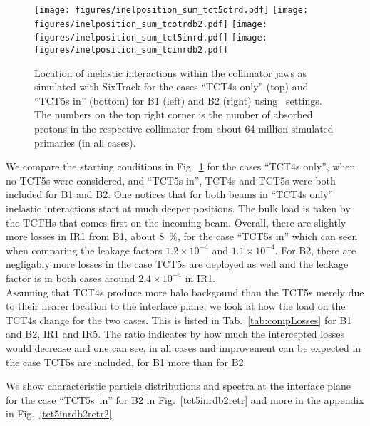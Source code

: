 \begin{figure}%
\begin{center}
\texttt{[image: figures/inelposition\_sum\_tct5otrd.pdf]}
\texttt{[image: figures/inelposition\_sum\_tcotrdb2.pdf]}
\texttt{[image: figures/inelposition\_sum\_tct5inrd.pdf]}
\texttt{[image: figures/inelposition\_sum\_tcinrdb2.pdf]}
\end{center}
\vspace{-0.6cm}
 \caption{Location of inelastic interactions within the collimator jaws as simulated with SixTrack for the cases ``TCT4s only'' (top) and ``TCT5s in'' (bottom) for B1 (left) and B2 (right) using \twosigmaret~settings. The numbers on the top right corner is the number of absorbed protons in the respective collimator from about 64 million simulated primaries (in all cases).
  \label{inelHLtctsInOut}}
\end{figure}

We compare the starting conditions in Fig.~\ref{inelHLtctsInOut} for the cases ``TCT4s only'', when no TCT5s were considered, and ``TCT5s in'', TCT4s and TCT5s were both included for B1 and B2. One notices that for both beams in ``TCT4s only'' inelastic interactions start at much deeper positions. The bulk load is taken by the TCTHs that comes first on the incoming beam. Overall, there are slightly more losses in IR1 from B1, about 8~\%, for the case ``TCT5s in'' which can seen when comparing the leakage factors $1.2 \times 10^{-4}$ and $1.1 \times 10^{-4}$. For B2, there are negligably more losses in the case TCT5s are deployed as well and the leakage factor is in both cases around $2.4 \times 10^{-4}$ in IR1.\\

Assuming that TCT4s produce more halo backgound than the TCT5s merely due to their nearer location to the interface plane, we look at how the load on the TCT4s change for the two cases. This is listed in Tab.~\ref{tab:compLosses} for B1 and B2, IR1 and IR5. The ratio indicates by how much the intercepted losses would decrease and one can see, in all cases and improvement can be expected in the case TCT5s are included, for B1 more than for B2.


We show characteristic particle distributions and spectra at the interface plane for the case ``TCT5s~in'' for B2 in Fig.~\ref{tct5inrdb2retr} and more in the appendix in Fig.~\ref{tct5inrdb2retr2}.


